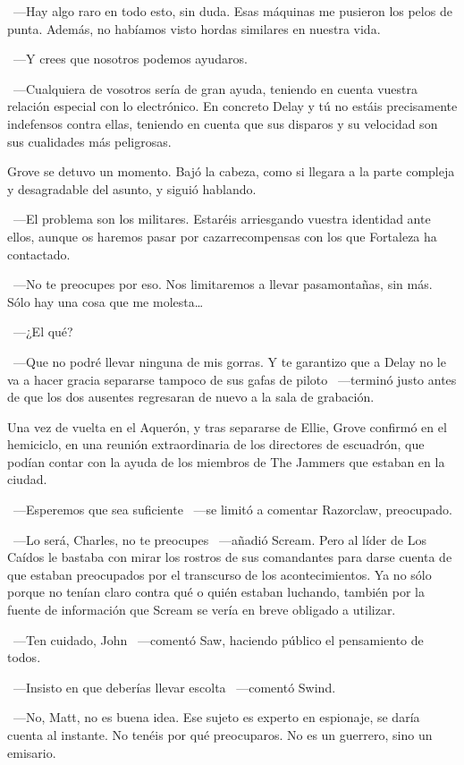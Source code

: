 ~---Hay algo raro en todo esto, sin duda. Esas máquinas me pusieron los pelos de punta. Además, no habíamos visto hordas similares en nuestra vida.

~---Y crees que nosotros podemos ayudaros.

~---Cualquiera de vosotros sería de gran ayuda, teniendo en cuenta vuestra relación especial con lo electrónico. En concreto Delay y tú no estáis precisamente indefensos contra ellas, teniendo en cuenta que sus disparos y su velocidad son sus cualidades más peligrosas.

Grove se detuvo un momento. Bajó la cabeza, como si llegara a la parte compleja y desagradable del asunto, y siguió hablando.

~---El problema son los militares. Estaréis arriesgando vuestra identidad ante ellos, aunque os haremos pasar por cazarrecompensas con los que Fortaleza ha contactado.

~---No te preocupes por eso. Nos limitaremos a llevar pasamontañas, sin más. Sólo hay una cosa que me molesta\dots

~---¿El qué?

~---Que no podré llevar ninguna de mis gorras. Y te garantizo que a Delay no le va a hacer gracia separarse tampoco de sus gafas de piloto ~---terminó justo antes de que los dos ausentes regresaran de nuevo a la sala de grabación.

\parbreak
Una vez de vuelta en el Aquerón, y tras separarse de Ellie, Grove confirmó en el hemiciclo, en una reunión extraordinaria de los directores de escuadrón, que podían contar con la ayuda de los miembros de The Jammers que estaban en la ciudad.

~---Esperemos que sea suficiente ~---se limitó a comentar Razorclaw, preocupado.

~---Lo será, Charles, no te preocupes ~---añadió Scream. Pero al líder de Los Caídos le bastaba con mirar los rostros de sus comandantes para darse cuenta de que estaban preocupados por el transcurso de los acontecimientos. Ya no sólo porque no tenían claro contra qué o quién estaban luchando, también por la fuente de información que Scream se vería en breve obligado a utilizar.

~---Ten cuidado, John ~---comentó Saw, haciendo público el pensamiento de todos.

~---Insisto en que deberías llevar escolta ~---comentó Swind.

~---No, Matt, no es buena idea. Ese sujeto es experto en espionaje, se daría cuenta al instante. No tenéis por qué preocuparos. No es un guerrero, sino un emisario.


